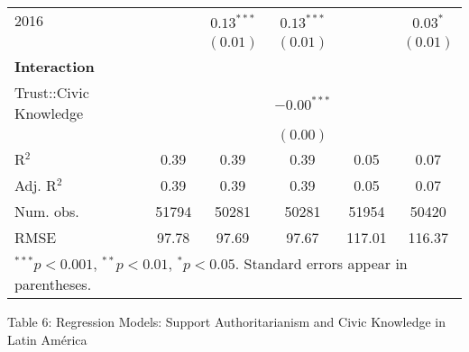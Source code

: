 \documentclass{article}
\begin{document}
\begin{landscape}
\begin{table}
\begin{center}
\begin{tabular}{l c c c c c }
2016                       &               & $0.13^{***}$    & $0.13^{***}$    &               & $0.03^{*}$    \\
                            &               & $(0.01)$        & $(0.01)$        &               & $(0.01)$      \\
\textbf{Interaction} &  &    &    &       &               \\
Trust::Civic Knowledge &               &                 & $-0.00^{***}$   &               &               \\
                            &               &                 & $(0.00)$        &               &               \\
\hline
R$^2$                       & 0.39          & 0.39            & 0.39            & 0.05          & 0.07          \\
Adj. R$^2$                  & 0.39          & 0.39            & 0.39            & 0.05          & 0.07          \\
Num. obs.                   & 51794         & 50281           & 50281           & 51954         & 50420         \\
RMSE                        & 97.78         & 97.69           & 97.67           & 117.01        & 116.37        \\
\hline
\multicolumn{6}{l}{\scriptsize{$^{***}p<0.001$, $^{**}p<0.01$, $^*p<0.05$. Standard errors appear in parentheses.}}
\end{tabular}
\label{table:coefficients}
\end{center}
\end{table}
\end{landscape}



\begin{center} 
Table 6: Regression Models: Support Authoritarianism and Civic Knowledge in Latin América
\end{center}
\end{document}
